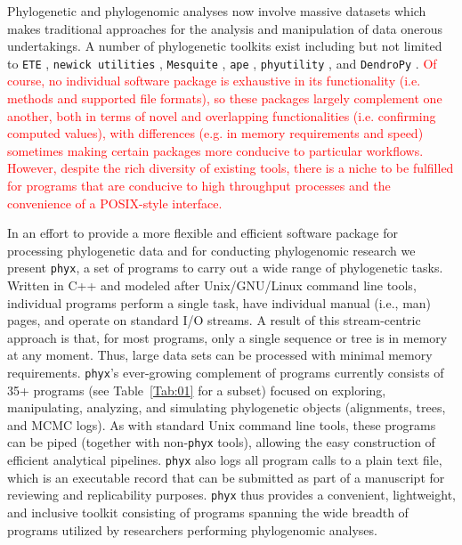 \documentclass{bioinfo}
\begin{document}
Phylogenetic and phylogenomic analyses now involve massive datasets which makes traditional approaches for the analysis and manipulation of data onerous undertakings. A number of phylogenetic toolkits exist including but not limited to \texttt{ETE} \citep{HuertaCepas2016}, \texttt{newick utilities} \citep{JunierZdobnov2010}, \texttt{Mesquite} \citep{MaddisonMaddison2016}, \texttt{ape} \citep{Popescu2012}, \texttt{phyutility} \citep{SmithDunn2008}, and \texttt{DendroPy} \citep{SukumaranHolder2010}.
\textcolor{red}{Of course, no individual software package is exhaustive in its functionality (i.e. methods and supported file formats), so these packages largely complement one another, both in terms of novel and overlapping functionalities (i.e. confirming computed values), with differences (e.g. in memory requirements and speed) sometimes making certain packages more conducive to particular workflows. However, despite the rich diversity of existing tools, there is a niche to be fulfilled for programs that are conducive to high throughput processes and the convenience of a POSIX-style interface.}

In an effort to provide a more flexible and efficient software package for processing phylogenetic data and for conducting phylogenomic research we present \texttt{phyx}, a set of programs to carry out a wide range of phylogenetic tasks. Written in C++ and modeled after Unix/GNU/Linux command line tools, individual programs perform a single task, have individual manual (i.e., man) pages, and operate on standard I/O streams. A result of this stream-centric approach is that, for most programs, only a single sequence or tree is in memory at any moment. Thus, large data sets can be processed with minimal memory requirements. \texttt{phyx}'s ever-growing complement of programs currently consists of 35+ programs (see Table~\ref{Tab:01} for a subset) focused on exploring, manipulating, analyzing, and simulating phylogenetic objects (alignments, trees, and MCMC logs). As with standard Unix command line tools, these programs can be piped (together with non-\texttt{phyx} tools), allowing the easy construction of efficient analytical pipelines. \texttt{phyx} also logs all program calls to a plain text file, which is an executable record that can be submitted as part of a manuscript for reviewing and replicability purposes. \texttt{phyx} thus provides a convenient, lightweight, and inclusive toolkit consisting of programs spanning the wide breadth of programs utilized by researchers performing phylogenomic analyses.\vspace*{-12pt}
\end{document}
